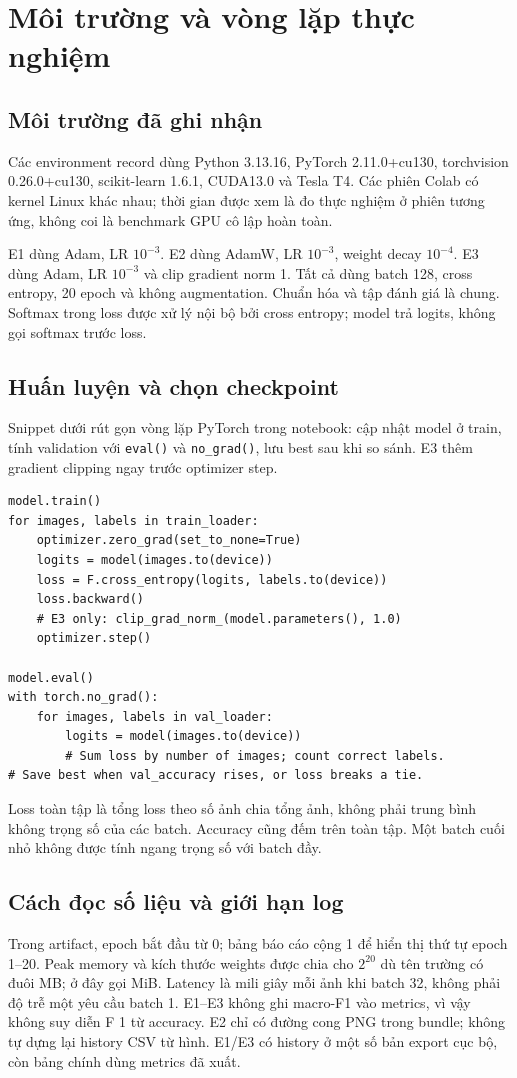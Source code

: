 \documentclass[11pt,a4paper]{article}
\begin{document}
\section{Môi trường và vòng lặp thực nghiệm}\label{sec:training}
\subsection{Môi trường đã ghi nhận}
Các environment record dùng Python 3.13.16, PyTorch 2.11.0+cu130, torchvision 0.26.0+cu130, scikit-learn 1.6.1, CUDA13.0 và Tesla T4. Các phiên Colab có kernel Linux khác nhau; thời gian được xem là đo thực nghiệm ở phiên tương ứng, không coi là benchmark GPU cô lập hoàn toàn.

E1 dùng Adam, LR $10^{-3}$. E2 dùng AdamW, LR $10^{-3}$, weight decay $10^{-4}$. E3 dùng Adam, LR $10^{-3}$ và clip gradient norm 1. Tất cả dùng batch 128, cross entropy, 20 epoch và không augmentation. Chuẩn hóa và tập đánh giá là chung. Softmax trong loss được xử lý nội bộ bởi cross entropy; model trả logits, không gọi softmax trước loss.

\subsection{Huấn luyện và chọn checkpoint}
Snippet dưới rút gọn vòng lặp PyTorch trong notebook: cập nhật model ở train, tính validation với \texttt{eval()} và \texttt{no\_grad()}, lưu best sau khi so sánh. E3 thêm gradient clipping ngay trước optimizer step.
\begin{lstlisting}
model.train()
for images, labels in train_loader:
    optimizer.zero_grad(set_to_none=True)
    logits = model(images.to(device))
    loss = F.cross_entropy(logits, labels.to(device))
    loss.backward()
    # E3 only: clip_grad_norm_(model.parameters(), 1.0)
    optimizer.step()

model.eval()
with torch.no_grad():
    for images, labels in val_loader:
        logits = model(images.to(device))
        # Sum loss by number of images; count correct labels.
# Save best when val_accuracy rises, or loss breaks a tie.
\end{lstlisting}

Loss toàn tập là tổng loss theo số ảnh chia tổng ảnh, không phải trung bình không trọng số của các batch. Accuracy cũng đếm trên toàn tập. Một batch cuối nhỏ không được tính ngang trọng số với batch đầy.

\subsection{Cách đọc số liệu và giới hạn log}
Trong artifact, epoch bắt đầu từ 0; bảng báo cáo cộng 1 để hiển thị thứ tự epoch 1--20. Peak memory và kích thước weights được chia cho $2^{20}$ dù tên trường có đuôi MB; ở đây gọi MiB. Latency là mili giây mỗi ảnh khi batch 32, không phải độ trễ một yêu cầu batch 1. E1--E3 không ghi macro-F1 vào metrics, vì vậy không suy diễn F 1 từ accuracy. E2 chỉ có đường cong PNG trong bundle; không tự dựng lại history CSV từ hình. E1/E3 có history ở một số bản export cục bộ, còn bảng chính dùng metrics đã xuất.
\clearpage
\end{document}
